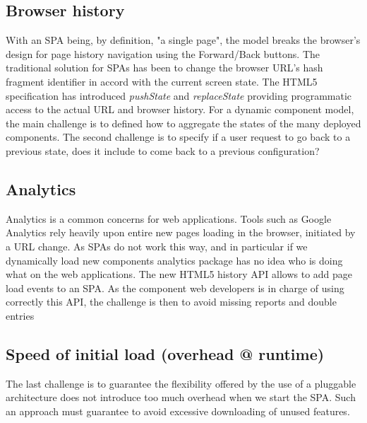 \subsection{Browser history}
With an SPA being, by definition, "a single page", the model breaks the browser's design for page history navigation using the Forward/Back buttons. The traditional solution for SPAs has been to change the browser URL's hash fragment identifier in accord with the current screen state. The HTML5 specification has introduced \textit{pushState} and \textit{replaceState} providing programmatic access to the actual URL and browser history. For a dynamic component model, the main challenge is to defined how to aggregate the states of the many deployed components. The second challenge is to specify if a user request to go back to a previous state, does it include to come back to a previous configuration? 

\subsection{Analytics}

Analytics is a common concerns for web applications. Tools such as Google Analytics rely heavily upon entire new pages loading in the browser, initiated by a URL change. As SPAs do not work this way, and in particular if we dynamically load new components analytics package has no idea who is doing what on the web applications. The new HTML5 history API allows to add page load events to an SPA. As the component web developers is in charge of using correctly this API, the challenge is then to avoid missing reports and double entries   
\subsection{Speed of initial load (overhead @ runtime) }
The last challenge is to guarantee the flexibility offered by the use of a pluggable architecture does not introduce too much overhead when we start the SPA. Such an approach must guarantee to  avoid excessive downloading of unused features. 
